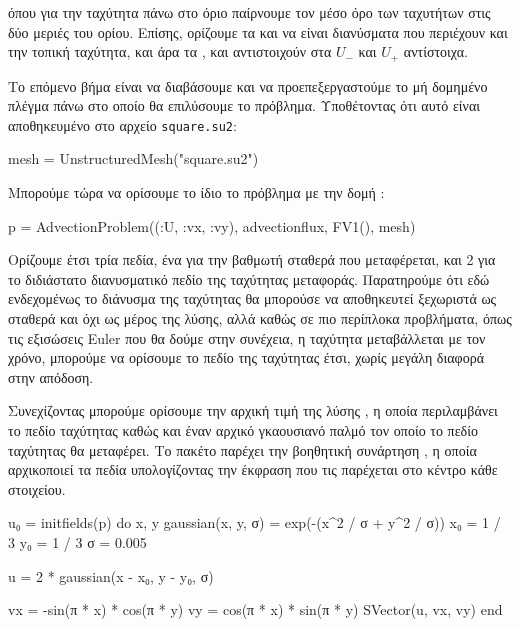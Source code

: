 όπου για την ταχύτητα πάνω στο όριο παίρνουμε τον μέσο όρο των ταχυτήτων στις δύο μεριές του ορίου.
Επίσης, ορίζουμε τα  και  να είναι διανύσματα που περιέχουν και την τοπική ταχύτητα, και άρα τα , και  αντιστοιχούν στα $U_{-}$ και $U_{+}$ αντίστοιχα.

Το επόμενο βήμα είναι να διαβάσουμε και να προεπεξεργαστούμε το μή δομημένο πλέγμα πάνω στο οποίο θα επιλύσουμε το πρόβλημα.
Υποθέτοντας ότι αυτό είναι αποθηκευμένο στο αρχείο \texttt{square.su2}:

{\large
\begin{jllisting}[language=julia,style=jlcodestyle]
mesh = UnstructuredMesh("square.su2")
\end{jllisting}
}

Μπορούμε τώρα να ορίσουμε το ίδιο το πρόβλημα με την δομή :

{\large
\begin{jllisting}[language=julia,style=jlcodestyle]
p = AdvectionProblem((:U, :vx, :vy), advectionflux, FV1(), mesh)
\end{jllisting}
}

Ορίζουμε έτσι τρία πεδία, ένα για την βαθμωτή σταθερά που μεταφέρεται, και 2 για το διδιάστατο διανυσματικό πεδίο της ταχύτητας μεταφοράς.
Παρατηρούμε ότι εδώ ενδεχομένως το διάνυσμα της ταχύτητας θα μπορούσε να αποθηκευτεί ξεχωριστά ως σταθερά και όχι ως μέρος της λύσης, αλλά καθώς σε πιο περίπλοκα προβλήματα, όπως τις εξισώσεις Euler που θα δούμε στην συνέχεια, η ταχύτητα μεταβάλλεται με τον χρόνο, μπορούμε να ορίσουμε το πεδίο της ταχύτητας έτσι, χωρίς μεγάλη διαφορά στην απόδοση.

Συνεχίζοντας μπορούμε ορίσουμε την αρχική τιμή της λύσης , η οποία περιλαμβάνει το πεδίο ταχύτητας καθώς και έναν αρχικό γκαουσιανό παλμό τον οποίο το πεδίο ταχύτητας θα μεταφέρει.
Το πακέτο  παρέχει την βοηθητική συνάρτηση , η οποία αρχικοποιεί τα πεδία υπολογίζοντας την έκφραση που τις παρέχεται στο κέντρο κάθε στοιχείου.

{\large
\begin{jllisting}[language=julia,style=jlcodestyle]
u₀ = initfields(p) do x, y
    gaussian(x, y, σ) = exp(-(x^2 / σ + y^2 / σ))
    x₀ = 1 / 3
    y₀ = 1 / 3
    σ = 0.005

    u = 2 * gaussian(x - x₀, y - y₀, σ)

    vx = -sin(π * x) * cos(π * y)
    vy = cos(π * x) * sin(π * y)
    SVector(u, vx, vy)
end
\end{jllisting}
}

